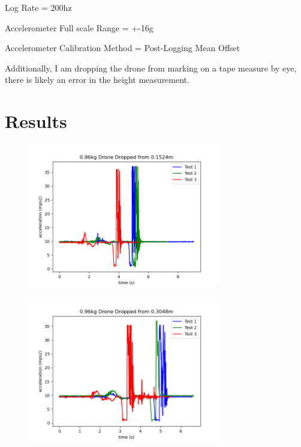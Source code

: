 \documentclass[12pt,letterpaper]{article}
\begin{document}
\begin{description}
    \item Log Rate = 200hz
    \item Accelerometer Full scale Range = +-16g
    \item Accelerometer Calibration Method = Post-Logging Mean Offset
\end{description}

Additionally, I am dropping the drone from marking on a tape measure by eye, there is likely an error in the height measurement.

\pagebreak


\section{Results}


\begin{figure}[h!]
\centering
\includegraphics[width = 0.75\textwidth]{Impact_Fig/6in.png}
\end{figure}

\begin{figure}[h]
\centering
\includegraphics[width = 0.75\textwidth]{Impact_Fig/1ft.png}
\end{figure}
\end{document}
